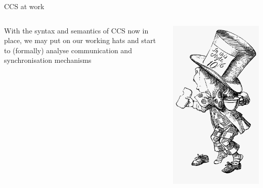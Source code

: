 \documentclass{beamer}
\begin{document}
\begin{frame}{CCS at work}
  \begin{minipage}[0.3\textheight]{\textwidth}
  \begin{columns}[c]
  \begin{column}{0.62\textwidth}
    With the syntax and semantics of CCS now in place, we may put on
    our working hats and start to (formally) analyse
    \alert{communication} and \alert{synchronisation} mechanisms
  \end{column}
  \begin{column}{0.28\textwidth}
    \includegraphics[scale=0.1]{images/mad-hatter.png}
  \end{column}
  \end{columns}
  \end{minipage}
\end{frame}
\end{document}
